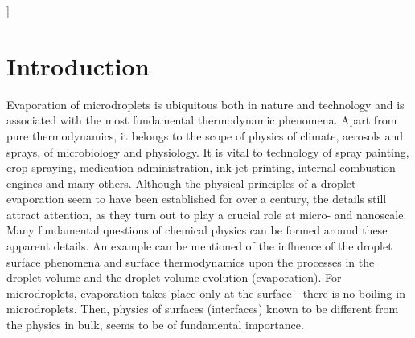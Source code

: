 \documentclass[twoside,twocolumn,9pt]{article}
\begin{document}
\begin{@twocolumnfalse}
\begin{tabular}{m{4.5cm} p{13.5cm} }
\end{tabular}

 \end{@twocolumnfalse} \vspace{0.6cm}

  ]

\renewcommand*\rmdefault{bch}\normalfont\upshape
\rmfamily
\section*{}
\vspace{-1cm}










\section{Introduction}
Evaporation of microdroplets is ubiquitous both in nature and technology and is associated with the most fundamental thermodynamic phenomena. Apart from pure thermodynamics, it belongs to the scope of physics of climate, aerosols and sprays, of microbiology and physiology. It is vital to technology of spray painting, crop spraying, medication administration, ink-jet printing, internal combustion engines and many others. Although  the physical principles of a droplet evaporation seem to have been established for over a century, the details still attract attention, as they turn out to play a crucial role at micro- and nanoscale. Many fundamental questions of chemical physics can be formed around these apparent details. An example can be mentioned of the influence of the droplet surface phenomena and surface thermodynamics upon the processes in the droplet volume and the droplet volume evolution (evaporation). For microdroplets, evaporation takes place only at the surface - there is no boiling in microdroplets. Then, physics of surfaces (interfaces) known to be different from the physics in bulk, seems to be of fundamental importance. 
\end{document}

